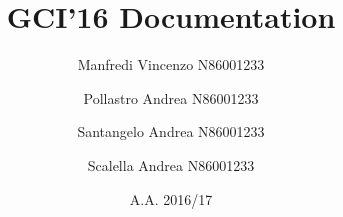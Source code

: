 \documentclass[11pt,a4paper,openright]{article}
\begin{document}
\title{\bfseries{GCI'16 Documentation}}
\author{Manfredi Vincenzo N86001233 \and Pollastro Andrea N86001233 \and Santangelo Andrea N86001233 \and Scalella Andrea N86001233}
\date{A.A. 2016/17}
\maketitle

\cleardoublepage
\tableofcontents
\cleardoublepage


\end{document}
